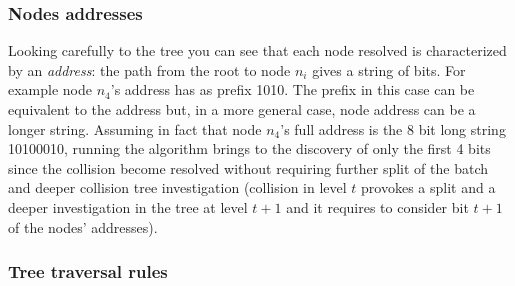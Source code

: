 \documentclass[12pt,a4paper,twocolumns]{report}
\begin{document}
\subsubsection{Nodes addresses}

Looking carefully to the tree you can see that each node resolved is characterized by an \emph{address}: the path from the root to node $n_{i}$ gives  a string of bits. For example node $n_{4}$'s address has as prefix 1010. The prefix in this case can be equivalent to the address but, in a more general case, node address can be a longer string. Assuming in fact that node $n_{4}$'s full address is the 8 bit long string 10100010, running the algorithm brings to the discovery of only the first 4 bits since the collision become resolved without requiring further split of the batch and deeper collision tree investigation (collision in level $t$ provokes a split and a deeper investigation in the tree at level $t+1$ and it requires to consider bit $t+1$ of the nodes' addresses).\\

\subsubsection{Tree traversal rules}
\end{document}
